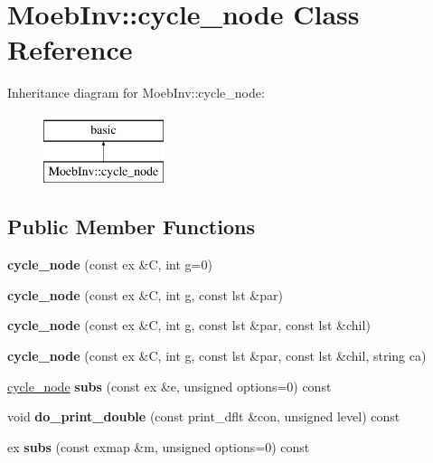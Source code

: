 \hypertarget{class_moeb_inv_1_1cycle__node}{}\section{Moeb\+Inv\+:\+:cycle\+\_\+node Class Reference}
\label{class_moeb_inv_1_1cycle__node}
Inheritance diagram for Moeb\+Inv\+:\+:cycle\+\_\+node\+:\begin{figure}[H]
\begin{center}
\leavevmode
\includegraphics[height=2.000000cm]{class_moeb_inv_1_1cycle__node}
\end{center}
\end{figure}
\subsection*{Public Member Functions}
\begin{DoxyCompactItemize}
\item 
\mbox{\label{class_moeb_inv_1_1cycle__node_a0c4a6c987fe260cde30a53073ecd1a67}} 
{\bfseries cycle\+\_\+node} (const ex \&C, int g=0)
\item 
\mbox{\label{class_moeb_inv_1_1cycle__node_ad85d4ed7473fc95e446cd7348907aceb}} 
{\bfseries cycle\+\_\+node} (const ex \&C, int g, const lst \&par)
\item 
\mbox{\label{class_moeb_inv_1_1cycle__node_ac289e7bbafa6ba7507423d9b89cac38f}} 
{\bfseries cycle\+\_\+node} (const ex \&C, int g, const lst \&par, const lst \&chil)
\item 
\mbox{\label{class_moeb_inv_1_1cycle__node_a76742aec0d5235ca8c4583421d349f3f}} 
{\bfseries cycle\+\_\+node} (const ex \&C, int g, const lst \&par, const lst \&chil, string ca)
\item 
\mbox{\label{class_moeb_inv_1_1cycle__node_a7a05170989e3dc5698c0f87712b53cf6}} 
\mbox{\hyperlink{class_moeb_inv_1_1cycle__node}{cycle\+\_\+node}} {\bfseries subs} (const ex \&e, unsigned options=0) const
\item 
\mbox{\label{class_moeb_inv_1_1cycle__node_a2b0c7857d32f39fc292dc192dd35608b}} 
void {\bfseries do\+\_\+print\+\_\+double} (const print\+\_\+dflt \&con, unsigned level) const
\item 
\mbox{\label{class_moeb_inv_1_1cycle__node_afaf89348492d91a3fbd20ddb65c2663d}} 
ex {\bfseries subs} (const exmap \&m, unsigned options=0) const
\end{DoxyCompactItemize}
